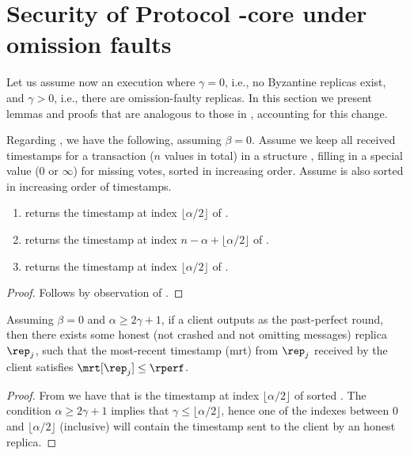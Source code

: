 \section{Security of Protocol \podtm-core under omission faults}\label{app:pod-security-crash}
Let us assume now an execution where $\gamma=0$, i.e., no Byzantine replicas exist, and $\gamma>0$, i.e., there are omission-faulty replicas.
In this section we present lemmas and proofs that are analogous to those in , accounting for this change.

\begin{lemma}\label{lem:assign-min-max-crash}
	Regarding , we have the following, assuming $\beta = 0$.
	Assume we keep all received timestamps for a transaction \tx ($n$ values in total) in a structure \txVotes, filling in a special  value ($0$  or $\infty$) for missing votes, sorted in increasing order.
	Assume \mrt is also sorted in increasing order of timestamps.
	\begin{enumerate}
		\item \opMinPossibleTs{} returns the timestamp at index $\lfloor \alpha / 2 \rfloor$ of \txVotes.
		\item \opMaxPossibleTs{} returns the timestamp at index $n - \alpha + \lfloor \alpha / 2 \rfloor$ of \txVotes.
		\item \opMinPossibleTsForNewTx{} returns the timestamp at index $\lfloor \alpha / 2 \rfloor $ of \mrt.
	\end{enumerate}
\end{lemma}
\begin{proof}
	Follows by observation of .
\end{proof}

\begin{lemma}\label{lem:rperf-value-of-honest-crash}
	Assuming $\beta = 0$ and $\alpha \geq 2 \gamma + 1$, if a client outputs \rperf as the past-perfect round,
	then there exists some honest (not crashed and not omitting messages) replica $\rep_j$, such that the most-recent timestamp (mrt) from $\rep_j$ received by the client satisfies $\mrt[\rep_j] \leq \rperf$.
\end{lemma}
\begin{proof}
	From  we have that \rperf is the timestamp at index $\lfloor \alpha / 2 \rfloor $ of sorted \mrt.
	The condition $\alpha \geq 2\gamma + 1$ implies that $\gamma \leq \lfloor \alpha / 2 \rfloor$,
	hence one of the indexes between $0$ and $\lfloor \alpha / 2 \rfloor $ (inclusive) will
	contain the timestamp sent to the client by an honest replica.
\end{proof}


